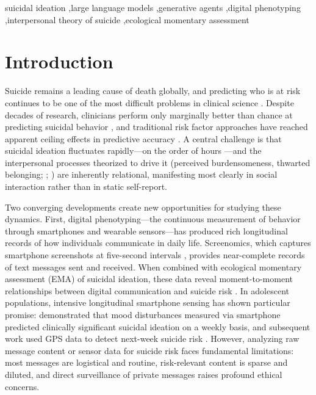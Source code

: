 \documentclass[review,12pt,authoryear]{elsarticle}
\begin{document}
\begin{frontmatter}
\begin{abstract}
demonstrated moderate stability (Spearman-Brown $= .538$), with both halves independently predicting SI. These findings demonstrate that simulated social interaction can amplify latent vulnerability signals in a proof-of-concept that bridges digital phenotyping, generative AI, and suicide theory.
\end{abstract}

\begin{keyword}
suicidal ideation \sep large language models \sep generative agents \sep digital phenotyping \sep interpersonal theory of suicide \sep ecological momentary assessment
\end{keyword}

\end{frontmatter}

\linenumbers

\section{Introduction}

Suicide remains a leading cause of death globally, and predicting who is at risk continues to be one of the most difficult problems in clinical science \citep{franklin2017risk}. Despite decades of research, clinicians perform only marginally better than chance at predicting suicidal behavior \citep{large2017meta}, and traditional risk factor approaches have reached apparent ceiling effects in predictive accuracy \citep{belsher2019prediction}. A central challenge is that suicidal ideation fluctuates rapidly---on the order of hours \citep{kleiman2017examination}---and the interpersonal processes theorized to drive it (perceived burdensomeness, thwarted belonging; \citealt{joiner2005why}; \citealt{vanorden2010interpersonal}) are inherently relational, manifesting most clearly in social interaction rather than in static self-report.

Two converging developments create new opportunities for studying these dynamics. First, digital phenotyping---the continuous measurement of behavior through smartphones and wearable sensors---has produced rich longitudinal records of how individuals communicate in daily life. Screenomics, which captures smartphone screenshots at five-second intervals \citep{reeves2021screenomics}, provides near-complete records of text messages sent and received. When combined with ecological momentary assessment (EMA) of suicidal ideation, these data reveal moment-to-moment relationships between digital communication and suicide risk \citep{ammerman2026beyond}. In adolescent populations, intensive longitudinal smartphone sensing has shown particular promise: \citet{auerbach2023intensive} demonstrated that mood disturbances measured via smartphone predicted clinically significant suicidal ideation on a weekly basis, and subsequent work used GPS data to detect next-week suicide risk \citep{auerbach2025gps}. However, analyzing raw message content or sensor data for suicide risk faces fundamental limitations: most messages are logistical and routine, risk-relevant content is sparse and diluted, and direct surveillance of private messages raises profound ethical concerns.
\end{document}
